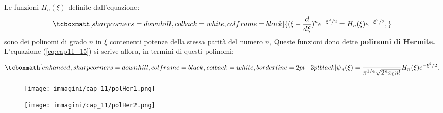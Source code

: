 \documentclass[a4paper,12pt,oneside]{book}
\begin{document}
 Le funzioni $H_n({\xi})$ definite dall'equazione:
	\begin{equation}
		\tcboxmath[sharp corners=downhill, colback=white, colframe=black]{
			(\xi-\frac{d}{d\xi})^n e^{-\xi^2/2}=H_n(\xi)e^{-\xi^2/2},
			}
	\end{equation}
sono dei polinomi di grado $n$ in $\xi$ contenenti potenze della stessa parità del numero $n$, Queste funzioni dono dette \textbf{polinomi di Hermite.} L'equazione (\ref{eq:cap11_15}) si scrive allora, in termini di questi polinomi:
	\begin{equation}
		\tcboxmath[enhanced, sharp corners=downhill, colframe=black, colback=white, borderline={2pt}{-3pt}{black}]{
			\psi_n(\xi)=\frac{1}{\pi^{1/4}\sqrt{2^nx_0n!}} H_n(\xi)e^{-\xi^2/2}.
			}
	\end{equation}
\newpage
\begin{figure}[htbp]
\begin{center}
\texttt{[image: immagini/cap\_11/polHer1.png]}
\end{center}
\end{figure}

\begin{figure}[htbp]
\begin{center}
\texttt{[image: immagini/cap\_11/polHer2.png]}
\end{center}
\end{figure}
\end{document}
